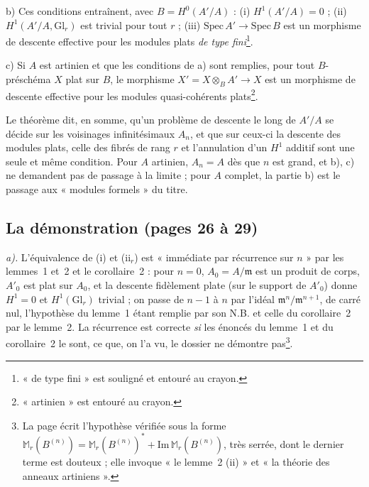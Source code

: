\documentclass[11pt,a4paper]{article}
\begin{document}
b) Ces conditions entraînent, avec $B = H^0(A'/A)$ : (i) $H^1(A'/A) = 0$ ;
(ii) $H^1(A'/A, \mathrm{Gl}_r)$ est trivial pour tout $r$ ; (iii)
$\mathrm{Spec}\, A' \to \mathrm{Spec}\, B$ est un morphisme de descente
effective pour les modules plats \emph{de type fini}\footnote{« de type
fini » est souligné et entouré au crayon.}.

c) Si $A$ est artinien et que les conditions de a) sont remplies, pour tout
$B$-préschéma $X$ plat sur $B$, le morphisme $X' = X \otimes_B A' \to X$ est
un morphisme de descente effective pour les modules quasi-cohérents
plats\footnote{« artinien » est entouré au crayon.}.

Le théorème dit, en somme, qu'un problème de descente le long de $A'/A$ se
décide sur les voisinages infinitésimaux $A_n$, et que sur ceux-ci la
descente des modules plats, celle des fibrés de rang $r$ et l'annulation
d'un $H^1$ additif sont une seule et même condition. Pour $A$ artinien, $A_n
= A$ dès que $n$ est grand, et b), c) ne demandent pas de passage à la
limite ; pour $A$ complet, la partie b) est le passage aux « modules
formels » du titre.

\subsection*{La démonstration (pages 26 à 29)}

\emph{a).} L'équivalence de (i) et (ii$_r$) est « immédiate par récurrence
sur $n$ » par les lemmes~1 et~2 et le corollaire~2 : pour $n = 0$, $A_0 =
A/\mathfrak{m}$ est un produit de corps, $A'_0$ est plat sur $A_0$, et la
descente fidèlement plate (sur le support de $A'_0$) donne $H^1 = 0$ et
$H^1(\mathrm{Gl}_r)$ trivial ; on passe de $n-1$ à $n$ par l'idéal
$\mathfrak{m}^n/\mathfrak{m}^{n+1}$, de carré nul, l'hypothèse du lemme~1
étant remplie par son N.B. et celle du corollaire~2 par le lemme~2. La
récurrence est correcte \emph{si} les énoncés du lemme~1 et du corollaire~2
le sont, ce que, on l'a vu, le dossier ne démontre pas\footnote{La page
écrit l'hypothèse vérifiée sous la forme $\mathbb{M}_r(B^{(n)}) =
\mathbb{M}_r(B^{(n)})^{*} + \mathrm{Im}\,\mathbb{M}_r(B^{(n)})$, très serrée,
dont le dernier terme est douteux ; elle invoque « le lemme~2 (ii) » et « la
théorie des anneaux artiniens ».}.
\end{document}
